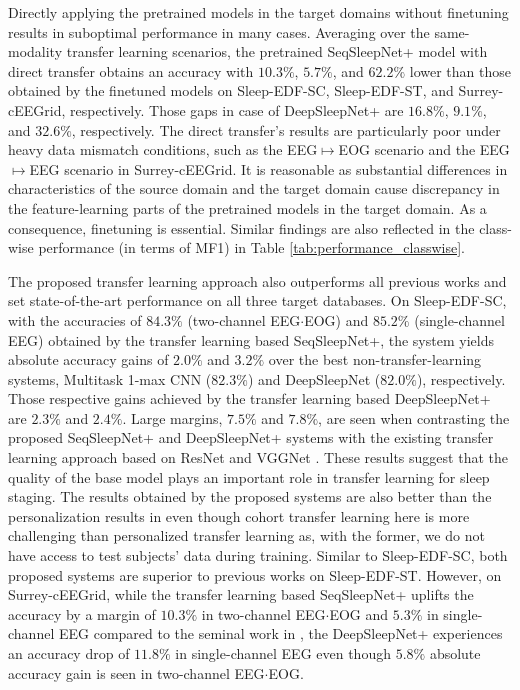 \documentclass[journal,twoside,web]{ieeecolor}
\begin{document}
Directly applying the pretrained models in the target domains without finetuning results in suboptimal performance in many cases. Averaging over the same-modality transfer learning scenarios, the pretrained SeqSleepNet+ model with direct transfer obtains an accuracy with $10.3\%$, $5.7\%$, and $62.2\%$ lower than those obtained by the finetuned models on Sleep-EDF-SC, Sleep-EDF-ST, and Surrey-cEEGrid, respectively. Those gaps in case of DeepSleepNet+ are $16.8\%$, $9.1\%$, and $32.6\%$, respectively. The direct transfer's results are particularly poor under heavy data mismatch conditions, such as the EEG$\mapsto$EOG scenario and the EEG$\mapsto$EEG scenario in Surrey-cEEGrid. It is reasonable as substantial differences in characteristics of the source domain and the target domain cause discrepancy in the feature-learning parts of the pretrained models in the target domain. As a consequence, finetuning is essential. Similar findings are also reflected in the class-wise performance (in terms of MF1) in Table \ref{tab:performance_classwise}.

The proposed transfer learning approach also outperforms all previous works and set state-of-the-art performance on all three target databases. On Sleep-EDF-SC, with the accuracies of $84.3\%$ (two-channel EEG$\cdot$EOG) and $85.2\%$ (single-channel EEG) obtained by the transfer learning based SeqSleepNet+, the system yields absolute accuracy gains of $2.0\%$ and $3.2\%$ over the best non-transfer-learning systems, Multitask 1-max CNN \cite{Phan2019b} ($82.3\%$) and DeepSleepNet \cite{Supratak2017} ($82.0\%$), respectively. Those respective gains achieved by the transfer learning based DeepSleepNet+ are $2.3\%$ and $2.4\%$. Large margins, $7.5\%$ and $7.8\%$, are seen when contrasting the proposed SeqSleepNet+ and DeepSleepNet+ systems with the existing transfer learning approach based on ResNet \cite{Andreotti2018} and VGGNet \cite{Vilamala2017}. These results suggest that the quality of the base model plays an important role in transfer learning for sleep staging. The results obtained by the proposed systems are also better than the personalization results in \cite{Mikkelsen2018} even though cohort transfer learning here is more challenging than personalized transfer learning as, with the former, we do not have access to test subjects' data during training. Similar to Sleep-EDF-SC, both proposed systems are superior to previous works on Sleep-EDF-ST. However, on Surrey-cEEGrid, while the transfer learning based SeqSleepNet+ uplifts the accuracy by a margin of $10.3\%$ in two-channel EEG$\cdot$EOG and $5.3\%$ in single-channel EEG compared to the seminal work in \cite{Mikkelsen2019}, the DeepSleepNet+ experiences an accuracy drop of $11.8\%$ in single-channel EEG even though $5.8\%$ absolute accuracy gain is seen in two-channel EEG$\cdot$EOG.
\end{document}
